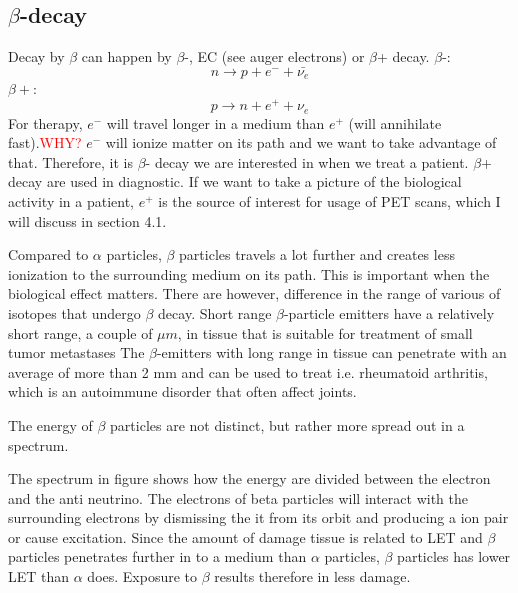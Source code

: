 \documentclass[twoside,english]{uiofysmaster/uiofysmaster}
\begin{document}
\subsection{$\beta$-decay}

Decay by $\beta$ can happen by $\beta$-, EC (see auger electrons) or $\beta$+ decay.
$\beta$-:
\begin{equation}
n \rightarrow p + e^- + \bar{\nu_e} 
\end{equation}
$\beta+$:
\begin{equation}
p \rightarrow n + e^+ + \nu_e
\end{equation}
For therapy, $e^-$ will travel longer in a medium than $e^+$ (will annihilate fast).\textcolor{red}{WHY?} $e^-$ will ionize matter on its path and we want to take advantage of that. Therefore, it is $\beta$- decay we are interested in when we treat a patient. $\beta$+ decay are used in diagnostic. If we want to take a picture of the biological activity in a patient, $e^+$ is the source of interest for usage of PET scans, which I will discuss in section 4.1.

Compared to $\alpha$ particles, $\beta$ particles travels a lot further and creates less ionization to the surrounding medium on its path. This is important when the biological effect matters. There are however, difference in the range of various of isotopes that undergo $\beta$ decay. Short range $\beta$-particle emitters have a relatively short range, a couple of $\mu m$, in tissue that is suitable for treatment of small tumor metastases%
The $\beta$-emitters with long range in tissue can penetrate with an average of more than 2 mm and can be used to treat i.e. rheumatoid arthritis, which is an autoimmune disorder that often affect joints.

The energy of $\beta$ particles are not distinct, but rather more spread out in a spectrum.


The spectrum in figure %
shows how the energy are divided between the electron and the anti neutrino. The electrons of beta particles will interact with the surrounding electrons by dismissing the it from its orbit and producing a ion pair or cause excitation. Since the amount of damage tissue is related to LET and $\beta$ particles penetrates further in to a medium than $\alpha$ particles, $\beta$ particles has lower LET than $\alpha$ does. Exposure to $\beta$ results therefore in less damage.
\end{document}
